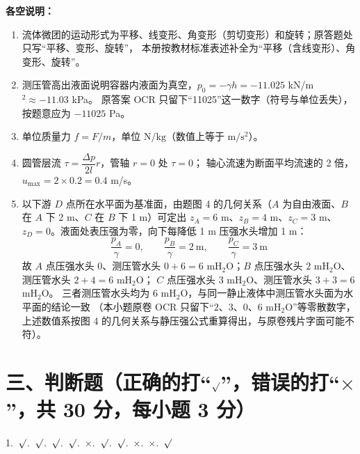 \begin{tishi}
\textbf{各空说明：}
\begin{enumerate}
  \item 流体微团的运动形式为平移、线变形、角变形（剪切变形）和旋转；原答题处只写“平移、变形、旋转”，
        本册按教材标准表述补全为“平移（含线变形）、角变形、旋转”。
  \item 测压管高出液面说明容器内液面为真空，$p_0=-\gamma h=-11.025$ kN/m$^2\approx-11.03$ kPa。
        原答案 OCR 只留下“11025”这一数字（符号与单位丢失），按题意应为 $-11025$ Pa。
  \item 单位质量力 $f=F/m$，单位 $\mathrm{N/kg}$（数值上等于 $\mathrm{m/s^2}$）。
  \item 圆管层流 $\tau=\dfrac{\Delta p}{2l}r$，管轴 $r=0$ 处 $\tau=0$；
        轴心流速为断面平均流速的 2 倍，$u_{\max}=2\times0.2=0.4$ m/s。
  \item 以下游 $D$ 点所在水平面为基准面，由题图 4 的几何关系（$A$ 为自由液面、$B$ 在 $A$ 下 2 m、$C$ 在 $B$ 下 1 m）可定出
        $z_A=6$ m、$z_B=4$ m、$z_C=3$ m、$z_D=0$。液面处表压强为零，向下每降低 1 m 压强水头增加 1 m：
        \[
        \frac{p_A}{\gamma}=0,\qquad
        \frac{p_B}{\gamma}=2\ \text{m},\qquad
        \frac{p_C}{\gamma}=3\ \text{m}
        \]
        故 $A$ 点压强水头 $0$、测压管水头 $0+6=6$ mH$_2$O；$B$ 点压强水头 $2$ mH$_2$O、测压管水头 $2+4=6$ mH$_2$O；
        $C$ 点压强水头 $3$ mH$_2$O、测压管水头 $3+3=6$ mH$_2$O。
        三者测压管水头均为 $6$ mH$_2$O，与同一静止液体中测压管水头面为水平面的结论一致
        （本小题原卷 OCR 只留下“$2$、$3$、$0$、$6$ mH$_2$O”等零散数字，
        上述数值系按图 4 的几何关系与静压强公式重算得出，与原卷残片字面可能不符）。
\end{enumerate}
\end{tishi}

\section{三、判断题（正确的打“$\surd$”，错误的打“$\times$”，共 30 分，每小题 3 分）}

\begin{center}
1.~$\surd$.~$\surd$.~$\surd$.~$\surd$.~$\times$.~$\surd$.~$\surd$.~$\times$.~$\times$.~$\surd$
\end{center}

